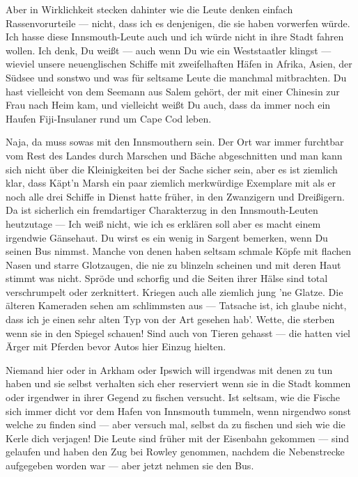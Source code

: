 Aber in Wirklichkeit stecken dahinter wie die Leute denken einfach Rassenvorurteile --- nicht, dass ich es denjenigen, die sie haben vorwerfen würde. Ich hasse diese Innsmouth-Leute auch und ich würde nicht in ihre Stadt fahren wollen. Ich denk, Du weißt --- auch wenn Du wie ein Weststaatler klingst --- wieviel unsere neuenglischen Schiffe mit zweifelhaften Häfen in Afrika, Asien, der Südsee und sonstwo und was für seltsame Leute die manchmal mitbrachten. Du hast vielleicht von dem Seemann aus Salem gehört, der mit einer Chinesin zur Frau nach Heim kam, und vielleicht weißt Du auch, dass da immer noch ein Haufen Fiji-Insulaner rund um Cape Cod leben.

Naja, da muss sowas mit den Innsmouthern sein. Der Ort war immer furchtbar vom Rest des Landes durch Marschen und Bäche abgeschnitten und man kann sich nicht über die Kleinigkeiten bei der Sache sicher sein, aber es ist ziemlich klar, dass Käpt'n Marsh ein paar ziemlich merkwürdige Exemplare mit als er noch alle drei Schiffe in Dienst hatte früher, in den Zwanzigern und Dreißigern. Da ist sicherlich ein fremdartiger Charakterzug in den Innsmouth-Leuten heutzutage --- Ich weiß nicht, wie ich es erklären soll aber es macht einem irgendwie Gänsehaut. Du wirst es ein wenig in Sargent bemerken, wenn Du seinen Bus nimmst. Manche von denen haben seltsam schmale Köpfe mit flachen Nasen und starre Glotzaugen, die nie zu blinzeln scheinen und mit deren Haut stimmt was nicht. Spröde und schorfig und die Seiten ihrer Hälse sind total verschrumpelt oder zerknittert. Kriegen auch alle ziemlich jung 'ne Glatze. Die älteren Kameraden sehen am schlimmsten aus --- Tatsache ist, ich glaube nicht, dass ich je einen sehr alten Typ von der Art gesehen hab'. Wette, die sterben wenn sie in den Spiegel schauen! Sind auch von Tieren gehasst --- die hatten viel Ärger mit Pferden bevor Autos hier Einzug hielten.

Niemand hier oder in Arkham oder Ipswich will irgendwas mit denen zu tun haben und sie selbst verhalten sich eher reserviert wenn sie in die Stadt kommen oder irgendwer in ihrer Gegend zu fischen versucht. Ist seltsam, wie die Fische sich immer dicht vor dem Hafen von Innsmouth tummeln, wenn nirgendwo sonst welche zu finden sind --- aber versuch mal, selbst da zu fischen und sieh wie die Kerle dich verjagen! Die Leute sind früher mit der Eisenbahn gekommen --- sind gelaufen und haben den Zug bei Rowley genommen, nachdem die Nebenstrecke aufgegeben worden war --- aber jetzt nehmen sie den Bus.


